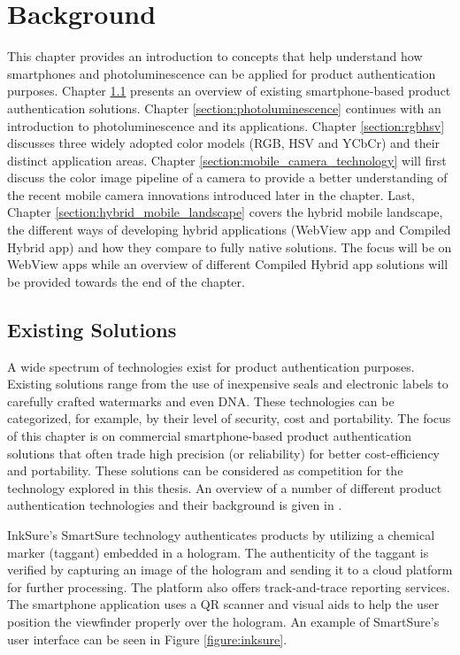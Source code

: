 \documentclass[thesis.tex]{subfiles}
\begin{document}
\chapter{Background}
\label{chapter:background}

This chapter provides an introduction to concepts that help understand how smartphones and photoluminescence can be applied for product authentication purposes. Chapter \ref{section:existing_solutions} presents an overview of existing smartphone-based product authentication solutions. Chapter \ref{section:photoluminescence} continues with an introduction to photoluminescence and its applications. Chapter \ref{section:rgbhsv} discusses three widely adopted color models (RGB, HSV and YCbCr) and their distinct application areas. Chapter \ref{section:mobile_camera_technology} will first discuss the color image pipeline of a camera to provide a better understanding of the recent mobile camera innovations introduced later in the chapter. Last, Chapter \ref{section:hybrid_mobile_landscape} covers the hybrid mobile landscape, the different ways of developing hybrid applications (WebView app and Compiled Hybrid app) and how they compare to fully native solutions. The focus will be on WebView apps while an overview of different Compiled Hybrid app solutions will be provided towards the end of the chapter.

\clearpage

\section{Existing Solutions}
\label{section:existing_solutions}

A wide spectrum of technologies exist for product authentication purposes. Existing solutions range from the use of inexpensive seals and electronic labels to carefully crafted watermarks and even DNA. These technologies can be categorized, for example, by their level of security, cost and portability. The focus of this chapter is on commercial smartphone-based product authentication solutions that often trade high precision (or reliability) for better cost-efficiency and portability. These solutions can be considered as competition for the technology explored in this thesis. An overview of a number of different product authentication technologies and their background is given in \cite{kuosmanen}.

InkSure's SmartSure technology authenticates products by utilizing a chemical marker (taggant) embedded in a hologram. The authenticity of the taggant is verified by capturing an image of the hologram and sending it to a cloud platform for further processing. The platform also offers track-and-trace reporting services. The smartphone application uses a QR scanner and visual aids to help the user position the viewfinder properly over the hologram. \cite{inksure} An example of SmartSure's user interface can be seen in Figure \ref{figure:inksure}.
\end{document}
